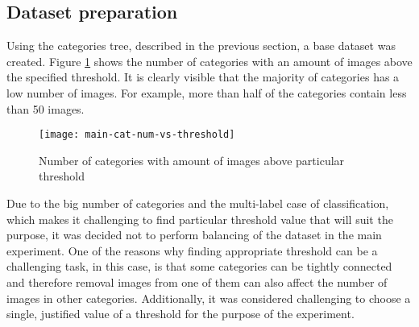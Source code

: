     
    
    
    
    
    
    
    
    
    \subsection{Dataset preparation}
    \label{sec:main-dataset-prep}
    Using the categories tree, described in the previous section, a base dataset was created. Figure \ref{fig:main-cat-num-vs-threshold} shows the number of categories with an amount of images above the specified threshold. It is clearly visible that the majority of categories has a low number of images. For example, more than half of the categories contain less than 50 images.
    
    
    \begin{figure}[h!]
        \centering
        \texttt{[image: main-cat-num-vs-threshold]}
        \caption{Number of categories with amount of images above particular threshold}
        \label{fig:main-cat-num-vs-threshold}
    \end{figure}
    
    Due to the big number of categories and the multi-label case of classification, which makes it challenging to find particular threshold value that will suit the purpose, it was decided not to perform balancing of the dataset in the main experiment. One of the reasons why finding appropriate threshold can be a challenging task, in this case, is that some categories can be tightly connected and therefore removal images from one of them can also affect the number of images in other categories. Additionally, it was considered challenging to choose a single, justified value of a threshold for the purpose of the experiment.
    
